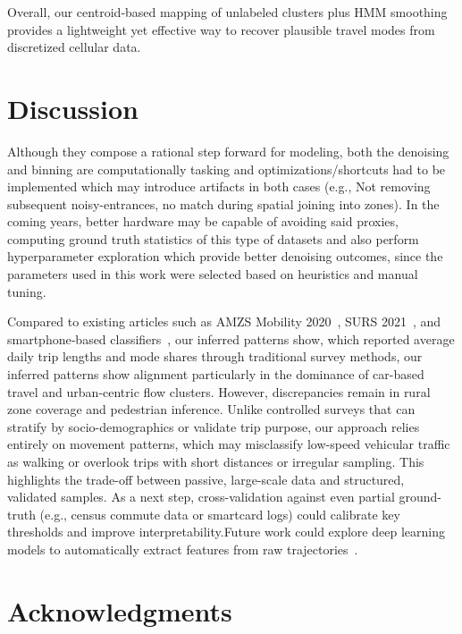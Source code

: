 \documentclass[fleqn,moreauthors,10pt]{ds_report}
\begin{document}
Overall, our centroid‐based mapping of unlabeled clusters plus HMM smoothing provides a lightweight yet effective way to recover plausible travel modes from discretized cellular data.


\section*{Discussion}

Although they compose a rational step forward for modeling, both the denoising and binning are computationally tasking and optimizations/shortcuts had to be implemented which may introduce artifacts in both cases (e.g., Not removing subsequent noisy-entrances, no match during spatial joining into zones). In the coming years, better hardware may be capable of avoiding said proxies, computing ground truth statistics of this type of datasets and also perform hyperparameter exploration which provide better denoising outcomes, since the parameters used in this work were selected based on heuristics and manual tuning.

Compared to existing articles such as AMZS Mobility 2020~\cite{amzs2020mobility}, SURS 2021~\cite{surs2021mobility}, and smartphone‐based classifiers~\cite{ashqar2020}, our inferred patterns show, which reported average daily trip lengths and mode shares through traditional survey methods, our inferred patterns show alignment particularly in the dominance of car-based travel and urban-centric flow clusters. However, discrepancies remain in rural zone coverage and pedestrian inference. Unlike controlled surveys that can stratify by socio-demographics or validate trip purpose, our approach relies entirely on movement patterns, which may misclassify low-speed vehicular traffic as walking or overlook trips with short distances or irregular sampling. This highlights the trade-off between passive, large-scale data and structured, validated samples. As a next step, cross-validation against even partial ground-truth (e.g., census commute data or smartcard logs) could calibrate key thresholds and improve interpretability.Future work could explore deep learning models to automatically extract features from raw trajectories~\cite{dabiri2018inferring}.



\section*{Acknowledgments}
\end{document}
